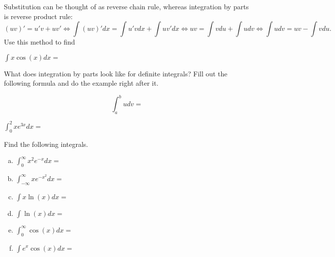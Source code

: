 \documentclass[answers]{exam}
\begin{document}
\begin{questions}


\question Substitution can be thought of as reverse chain rule, whereas integration by parts is reverse product rule: 
\[ (uv)' = u'v+uv' \iff \int (uv)'dx = \int u'v dx+\int uv'dx \iff uv = \int vdu + \int udv \iff \int udv = uv - \int vdu. \]
Use this method to find 

$\displaystyle \int x \cos(x) dx =$
 
\vspace{1.5in }

\question What does integration by parts look like for definite integrals? Fill out the following formula and do the example right after it.


\[ \displaystyle \int_a^b udv = \]

$\displaystyle \int_0^{2} x e^{3x} dx =$

\vspace{1in }

\question Find the following integrals.
\begin{enumerate}[(a)]
	
	\item $\displaystyle \int_{0}^{\infty} x^2 e^{-x} dx =$
	
	\vspace{1in}
	
	\item $\displaystyle \int_{-\infty}^{\infty} x e^{-x^2} dx =$
	
	\vspace{2in}
	
	\item $\displaystyle \int x\ln(x) dx =$
	
	\vspace{1.5in}
	
	\item $\displaystyle \int \ln(x) dx =$

	\vspace{1in}
	
	\item $\displaystyle \int_{0}^{\infty} \cos(x) dx =$
	
	\vspace{1in}
	
	\item $\displaystyle \int e^x\cos(x) dx =$
	
	\vspace{1in}
\end{enumerate}

\end{questions}
\end{document}
